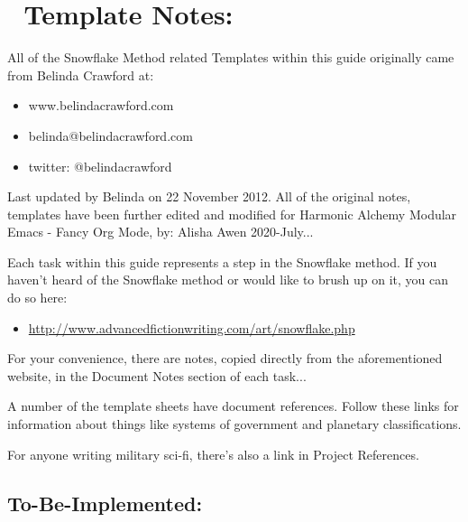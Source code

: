 \documentclass[openleft,oneside,showtrims]{memoir}
\begin{document}
\section{📃 Template Notes:}
\label{sec:org510bcbd}

All of the Snowflake Method related Templates within this guide originally came from Belinda Crawford at:

\begin{itemize}
\item www.belindacrawford.com
\item belinda@belindacrawford.com
\item twitter: @belindacrawford
\end{itemize}

Last updated by Belinda on 22 November 2012.  All of the original notes, templates have been further edited and modified for Harmonic Alchemy Modular Emacs - Fancy Org Mode, by: Alisha Awen 2020-July...

Each task within this guide represents a step in the Snowflake method. If you haven’t heard of the Snowflake method or would like to brush up on it, you can do so here: 

\begin{itemize}
\item \url{http://www.advancedfictionwriting.com/art/snowflake.php}
\end{itemize}

For your convenience, there are notes, copied directly from the aforementioned website, in the Document Notes section of each task...

A number of the template sheets have document references. Follow these links for information about things like systems of government and planetary classifications.

For anyone writing military sci-fi, there’s also a link in Project References.

\subsection{To-Be-Implemented:}
\label{sec:orgcfa013c}
\end{document}
